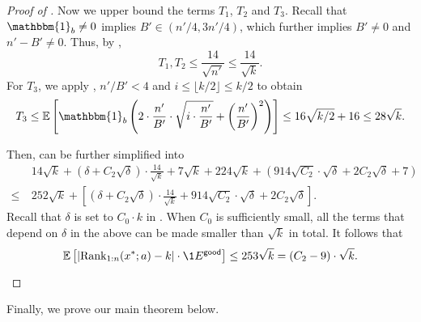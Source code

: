 \begin{proof}[Proof of ]
Now we upper bound the terms $T_1$, $T_2$ and $T_3$. Recall that $\mathbbm{1}_b \ne 0$ implies $B' \in (n'/4, 3n'/4)$, which further implies $B' \ne 0$ and $n' - B' \ne 0$. Thus, by ,
\[
    T_1, T_2
\le \frac{14}{\sqrt{n'}}
\le \frac{14}{\sqrt{k}}.
\]
For $T_3$, we apply , $n' / B' < 4$ and $i \le \lfloor k/2\rfloor \le k/2$ to obtain
\[
    T_3
\le \Ex{}{\mathbbm{1}_b\left(2\cdot\frac{n'}{B'}\cdot\sqrt{i\cdot \frac{n'}{B'}} + \left(\frac{n'}{B'}\right)^2\right)}
\le 16\sqrt{k/2} + 16 
\le 28\sqrt{k}.
\]

Then,  can be further simplified into
\begin{align*}
    &~14\sqrt{k} + (\delta + C_2\sqrt{\delta})\cdot\frac{14}{\sqrt{k}} + 7\sqrt{k} + 224\sqrt{k} + (914\sqrt{C_2}\cdot\sqrt{\delta} + 2C_2\sqrt{\delta} + 7)\\
\le &~252\sqrt{k} + \left[(\delta + C_2\sqrt{\delta})\cdot\frac{14}{\sqrt{k}} + 914\sqrt{C_2}\cdot\sqrt{\delta} + 2C_2\sqrt{\delta}\right].
\end{align*}
Recall that $\delta$ is set to $C_0\cdot k$ in . When $C_0$ is sufficiently small, all the terms that depend on $\delta$ in the above can be made smaller than $\sqrt{k}$ in total. It follows that
\[
    \Ex{}{\left|\rank_{1:n}(x^*; a) - k\right| \cdot \1{\goodevent}}
\le 253\sqrt{k}
=   (C_2 - 9)\cdot\sqrt{k}.
\]
\end{proof}

Finally, we prove our main theorem below.

\quantileapprox*

